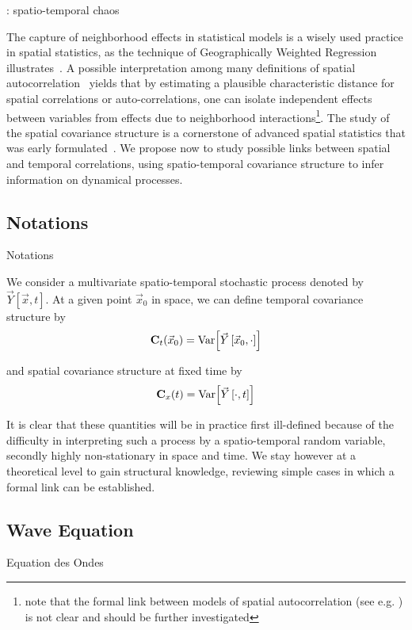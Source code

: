 \cite{cross1994spatiotemporal} : spatio-temporal chaos


The capture of neighborhood effects in statistical models is a wisely used practice in spatial statistics, as the technique of Geographically Weighted Regression illustrates~\cite{brunsdon1998geographically}. A possible interpretation among many definitions of spatial autocorrelation~\cite{griffith1992spatial} yields that by estimating a plausible characteristic distance for spatial correlations or auto-correlations, one can isolate independent effects between variables from effects due to neighborhood interactions\footnote{note that the formal link between models of spatial autocorrelation (see e.g. \cite{griffith2012advanced}) is not clear and should be further investigated}. The study of the spatial covariance structure is a cornerstone of advanced spatial statistics that was early formulated~\cite{griffith1980towards}. 
 We propose now to study possible links between spatial and temporal correlations, using spatio-temporal covariance structure to infer information on dynamical processes.


\subsection{Notations}{Notations}

We consider a multivariate spatio-temporal stochastic process denoted by $\vec{Y}\left[\vec{x},t\right]$. At a given point $\vec{x}_0$ in space, we can define temporal covariance structure by
\[
\mathbf{C}_t (\vec{x}_0) = \operatorname{Var}\!\left[\vec{Y}\left[\vec{x}_0, \cdot\right]\right]
\]

and spatial covariance structure at fixed time by
\[
\mathbf{C}_x (t) = \operatorname{Var}\!\left[\vec{Y}\left[\cdot, t\right]\right]
\]

It is clear that these quantities will be in practice first ill-defined because of the difficulty in interpreting such a process by a spatio-temporal random variable, secondly highly non-stationary in space and time. We stay however at a theoretical level to gain structural knowledge,
 reviewing simple cases in which a formal link can be established.


\subsection{Wave Equation}{Equation des Ondes}

